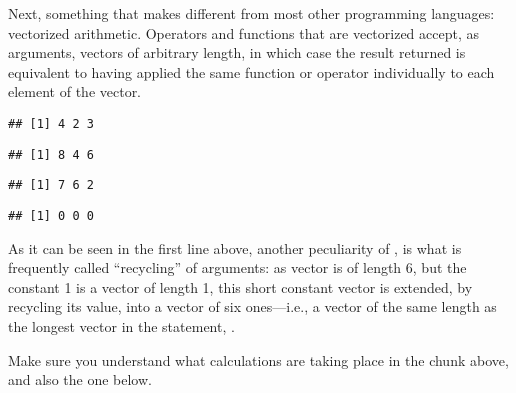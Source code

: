 \documentclass[krantz2]{krantz}\usepackage{knitr}
\begin{document}
Next,\label{par:calc:vectorized:opers} something that makes \Rlang different from most other programming languages: vectorized arithmetic. Operators and functions that are vectorized accept, as arguments, vectors of arbitrary length, in which case the result returned is equivalent to having applied the same function or operator individually to each element of the vector.\label{par:vectorized:numeric}

\begin{knitrout}\footnotesize
{}\color{fgcolor}\begin{kframe}
\begin{alltt}
 \hlopt{+}  
\end{alltt}
\begin{verbatim}
## [1] 4 2 3
\end{verbatim}
\begin{alltt}
 \hlopt{+} \hlstd{)} \hlopt{*} 
\end{alltt}
\begin{verbatim}
## [1] 8 4 6
\end{verbatim}
\begin{alltt}
 \hlopt{+} 
\end{alltt}
\begin{verbatim}
## [1] 7 6 2
\end{verbatim}
\begin{alltt}
 \hlopt{-} 
\end{alltt}
\begin{verbatim}
## [1] 0 0 0
\end{verbatim}
\end{kframe}
\end{knitrout}

As it can be seen in the first line above, another peculiarity of \Rpgrm, is what is frequently called ``recycling'' of arguments: as vector  is of length 6, but the constant 1 is a vector of length 1, this short constant vector is extended, by recycling its value, into a vector of six ones---i.e., a vector of the same length as the longest vector in the statement, .\label{par:recycling:numeric}

Make sure you understand what calculations are taking place in the chunk above, and also the one below.
\end{document}
